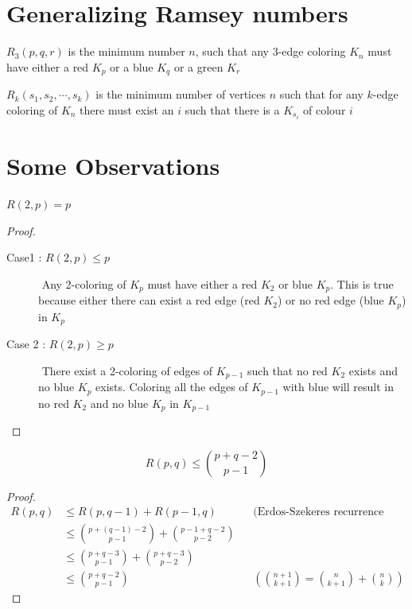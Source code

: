 \section{Generalizing Ramsey numbers}
\begin{definition}
$R_3(p,q,r)$ is the minimum number $n$, such that any 3-edge coloring $K_n$ must have either a red $K_p$ or a blue $K_q$ or a green $K_r$
\end{definition}
\begin{definition}
$R_k(s_1,s_2,\cdots ,s_k)$ is the minimum number of vertices $n$ such that for any $k$-edge coloring of $K_n$  there must exist an $i$ such that there is a $K_{s_i}$ of colour $i$
\end{definition}

\section{Some Observations}
\begin{property}
$R(2,p)=p$
\end{property}
\begin{proof}
$ $ 
 \begin{description}
    \item[Case1 : $R(2,p) \leq p$]
    $ $ \newline
    Any 2-coloring of $K_p$ must have either a red $K_2$ or blue $K_p$. This is true because either there can exist a red edge (red $K_2$) or no red edge (blue $K_p$) in $K_p$
    \item[Case 2 : $R(2,p) \geq p$]
    $ $ \newline
    There exist a 2-coloring of edges of $K_{p-1}$ such that no red $K_2$ exists and no blue $K_p$ exists. Coloring all the edges of $K_{p-1}$ with blue will result in no red $K_2$ and no blue $K_p$ in $K_{p-1}$
 \end{description}
\end{proof}
\begin{claim}
$$ R(p,q) \leq {p+q-2 \choose p-1} $$
\end{claim}
\begin{proof}
 \begin{align*}
     R(p,q) &\leq  R(p,q-1) + R(p-1,q) && \textrm{(Erdos-Szekeres recurrence relation)} \\
     &\leq {p+(q-1)-2 \choose p-1} + {p-1+q-2 \choose p-2} \\
     &\leq {p+q-3 \choose p-1} + {p+q-3 \choose p-2} \\
     &\leq {p+q-2 \choose p-1}  && ({n+1 \choose k+1} = {n \choose k+1} +{n \choose k})
 \end{align*}

\end{proof}
